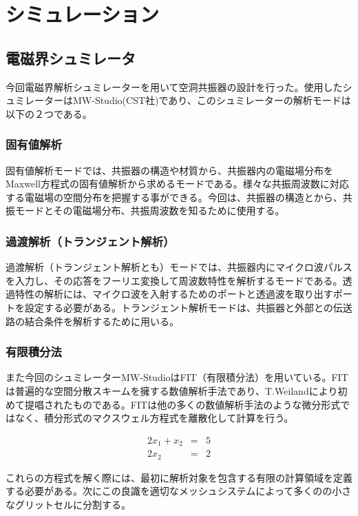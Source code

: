 \chapter{シミュレーション}

\section{電磁界シュミレータ}
今回電磁界解析シュミレーターを用いて空洞共振器の設計を行った。使用したシュミレーターはMW-Studio(CST社)\cite{CST}であり、このシュミレーターの解析モードは以下の２つである。\cite{MWS-1}

\subsection{固有値解析}
固有値解析モードでは、共振器の構造や材質から、共振器内の電磁場分布をMaxwell方程式の固有値解析から求めるモードである。様々な共振周波数に対応する電磁場の空間分布を把握する事ができる。今回は、共振器の構造とから、共振モードとその電磁場分布、共振周波数を知るために使用する。

\subsection{過渡解析（トランジェント解析）}
過渡解析（トランジェント解析とも）モードでは、共振器内にマイクロ波パルスを入力し、その応答をフーリエ変換して周波数特性を解析するモードである。透過特性の解析には、マイクロ波を入射するためのポートと透過波を取り出すポートを設定する必要がある。トランジェント解析モードは、共振器と外部との伝送路の結合条件を解析するために用いる。

\subsection{有限積分法}
また今回のシュミレーターMW-StudioはFIT（有限積分法）を用いている。\cite{MWS-2}FITは普遍的な空間分散スキームを擁する数値解析手法であり、T.Weilandにより初めて提唱されたものである。FITは他の多くの数値解析手法のような微分形式ではなく、積分形式のマクスウェル方程式を離散化して計算を行う。

\begin{eqnarray}
  2x_1 + x_2 & = & 5 \\
  2x_2 & = & 2
\end{eqnarray}

これらの方程式を解く際には、最初に解析対象を包含する有限の計算領域を定義する必要がある。次にこの良識を適切なメッシュシステムによって多くのの小さなグリットセルに分割する。

